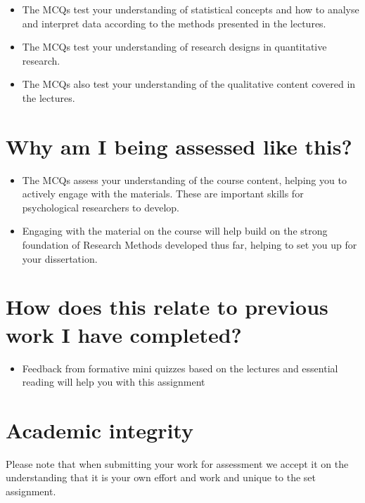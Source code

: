 \documentclass[
  english,
  letterpaper,
  DIV=11,
  numbers=noendperiod]{scrreprt}
\providecommand{\tightlist}{%
  \setlength{\itemsep}{0pt}\setlength{\parskip}{0pt}}
\begin{document}
\begin{itemize}
\item
  The MCQs test your understanding of statistical concepts and how to
  analyse and interpret data according to the methods presented in the
  lectures.
\item
  The MCQs test your understanding of research designs in quantitative
  research.
\item
  The MCQs also test your understanding of the qualitative content
  covered in the lectures.
\end{itemize}

\section{Why am I being assessed like
this?}\label{why-am-i-being-assessed-like-this-1}

\begin{itemize}
\item
  The MCQs assess your understanding of the course content, helping you
  to actively engage with the materials. These are important skills for
  psychological researchers to develop.
\item
  Engaging with the material on the course will help build on the strong
  foundation of Research Methods developed thus far, helping to set you
  up for your dissertation.
\end{itemize}

\section{How does this relate to previous work I have
completed?}\label{how-does-this-relate-to-previous-work-i-have-completed-1}

\begin{itemize}
\tightlist
\item
  Feedback from formative mini quizzes based on the lectures and
  essential reading will help you with this assignment
\end{itemize}

\section{Academic integrity}\label{academic-integrity}

Please note that when submitting your work for assessment we accept it
on the understanding that it is your own effort and work and unique to
the set assignment.
\end{document}
